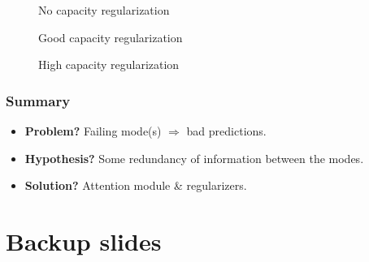 \documentclass[10pt]{beamer}
\begin{document}
\begin{frame}
\begin{multicols}{2}
\begin{figure}
\begin{overprint}
\end{overprint}
\caption{No capacity regularization}
\vspace*{-0.9cm}\caption{Good capacity regularization}
\vspace*{-0.9cm}\caption{High capacity regularization}
\end{figure}
\end{multicols}
\end{frame}


\begin{frame}
\frametitle{Summary}
\begin{itemize}
\item \textbf{Problem?} Failing mode(s) $\Rightarrow$ bad predictions.\vspace*{0.25cm}
\item \textbf{Hypothesis?} Some redundancy of information between the modes.\vspace*{0.25cm}
\item \textbf{Solution?} Attention module \& regularizers.\vspace*{0.25cm}
\end{itemize}
\end{frame}


\appendix
{}
\section{Backup slides}
\end{document}
